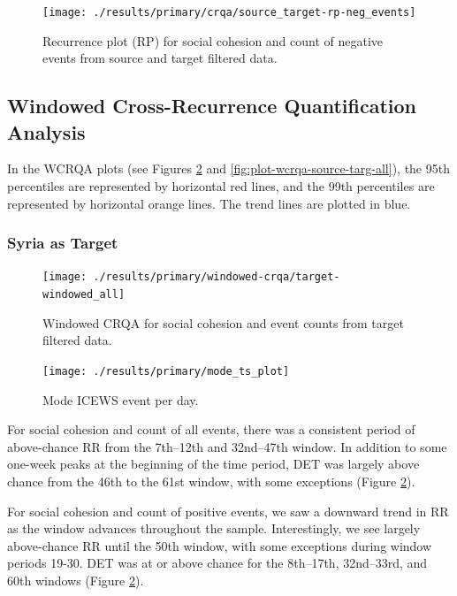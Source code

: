 \documentclass[
  english,
  man]{apa6}
\begin{document}
\begin{figure}
\texttt{[image: ./results/primary/crqa/source\_target-rp-neg\_events]} \caption{Recurrence plot (RP) for social cohesion and count of negative events from source and target filtered data.}\label{fig:plot-rp-source-targ-neg}
\end{figure}

\hypertarget{windowed-cross-recurrence-quantification-analysis-1}{%
\subsection{Windowed Cross-Recurrence Quantification Analysis}\label{windowed-cross-recurrence-quantification-analysis-1}}

In the WCRQA plots (see Figures \ref{fig:plot-wcrqa-targ-all} and
\ref{fig:plot-wcrqa-source-targ-all}), the 95th percentiles are represented by
horizontal red lines, and the 99th percentiles are represented by horizontal
orange lines. The trend lines are plotted in blue.

\hypertarget{syria-as-target-1}{%
\subsubsection{Syria as Target}\label{syria-as-target-1}}

\begin{figure}
\texttt{[image: ./results/primary/windowed-crqa/target-windowed\_all]} \caption{Windowed CRQA for social cohesion and event counts from target filtered data.}\label{fig:plot-wcrqa-targ-all}
\end{figure}

\begin{figure}
\texttt{[image: ./results/primary/mode\_ts\_plot]} \caption{Mode ICEWS event per day.}\label{fig:plot-mode-event}
\end{figure}

For social cohesion and count of all events, there was a consistent period of
above-chance RR from the 7th--12th and 32nd--47th window. In addition to some
one-week peaks at the beginning of the time period, DET was largely above chance
from the 46th to the 61st window, with some exceptions (Figure
\ref{fig:plot-wcrqa-targ-all}).

For social cohesion and count of positive events, we saw a downward trend in RR
as the window advances throughout the sample. Interestingly, we see largely
above-chance RR until the 50th window, with some exceptions during window
periods 19-30. DET was at or above chance for the 8th--17th, 32nd--33rd, and
60th windows (Figure \ref{fig:plot-wcrqa-targ-all}).
\end{document}
